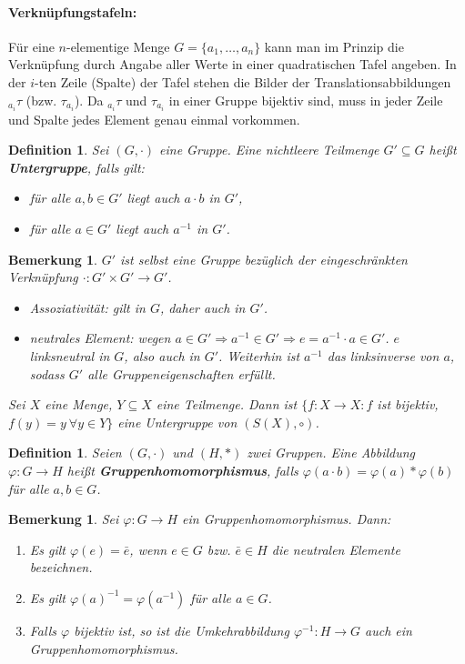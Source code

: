 \documentclass[12pt,a4paper]{article}
\theoremstyle{plain}
\newtheorem{Definition}[Theorem]{Definition}
\newtheorem{Bemerkung}[Theorem]{Bemerkung}
\newcommand{\herv}[1]{{\emph{\textbf{#1}}}}
\numberwithin{equation}{section}
\begin{document}
\paragraph{Verknüpfungstafeln:} Für eine $n$-elementige Menge $G=\{a_1,\ldots,a_n\}$ kann man im Prinzip die Verknüpfung durch Angabe aller Werte in einer quadratischen Tafel angeben. In der $i$-ten Zeile (Spalte) der Tafel stehen die Bilder der Translationsabbildungen ${}_{a_{i}}\tau$ (bzw. $\tau_{a_i}$). Da ${}_{a_{i}}\tau$ und $\tau_{a_i}$ in einer Gruppe bijektiv sind, muss in jeder Zeile und Spalte jedes Element genau einmal vorkommen.
\begin{Definition}
Sei $(G,\cdot)$ eine Gruppe. Eine nichtleere Teilmenge $G'\subseteq G$ heißt \herv{Untergruppe}, falls gilt:
\begin{itemize}
\item für alle $a,b\in G'$ liegt auch $a\cdot b$ in $G'$,
\item für alle $a\in G'$ liegt auch $a^{-1}$ in $G'$.
\end{itemize}
\end{Definition}
\begin{Bemerkung}
$G'$ ist selbst eine Gruppe bezüglich der eingeschränkten Verknüpfung $\cdot:G'\times G' \rightarrow G'$.
\begin{itemize}
\item Assoziativität: gilt in $G$, daher auch in $G'$.
\item neutrales Element: wegen $a\in G' \Rightarrow a^{-1}\in G' \Rightarrow e=a^{-1}\cdot a\in G'$. $e$ linksneutral in $G$, also auch in $G'$. Weiterhin ist $a^{-1}$ das linksinverse von $a$, sodass $G'$ alle Gruppeneigenschaften erfüllt.
\end{itemize}
Sei $X$ eine Menge, $Y\subseteq X$ eine Teilmenge. Dann ist $\{f:X\rightarrow X: f$ ist bijektiv, $f(y)=y\ \forall y\in Y\}$ eine Untergruppe von $(S(X),\circ)$.
\end{Bemerkung}
\begin{Definition}
Seien $(G,\cdot)$ und $(H,*)$ zwei Gruppen. Eine Abbildung $\varphi: G\rightarrow H$ heißt \herv{Gruppenhomomorphismus}, falls $\varphi(a\cdot b)=\varphi(a)*\varphi(b)$ für alle $a,b\in G$.
\end{Definition}
\begin{Bemerkung}
Sei $\varphi:G\rightarrow H$ ein Gruppenhomomorphismus. Dann:
\begin{enumerate}
\renewcommand{\labelenumi}{(\alph{enumi})}
\item Es gilt $\varphi(e)=\bar{e}$, wenn $e\in G$ bzw. $\bar{e}\in H$ die neutralen Elemente bezeichnen.
\item Es gilt $\varphi(a)^{-1}=\varphi(a^{-1})$ für alle $a\in G$.
\item Falls $\varphi$ bijektiv ist, so ist die Umkehrabbildung $\varphi^{-1}:H\rightarrow G$ auch ein Gruppenhomomorphismus.
\end{enumerate}
\end{Bemerkung}
\end{document}
